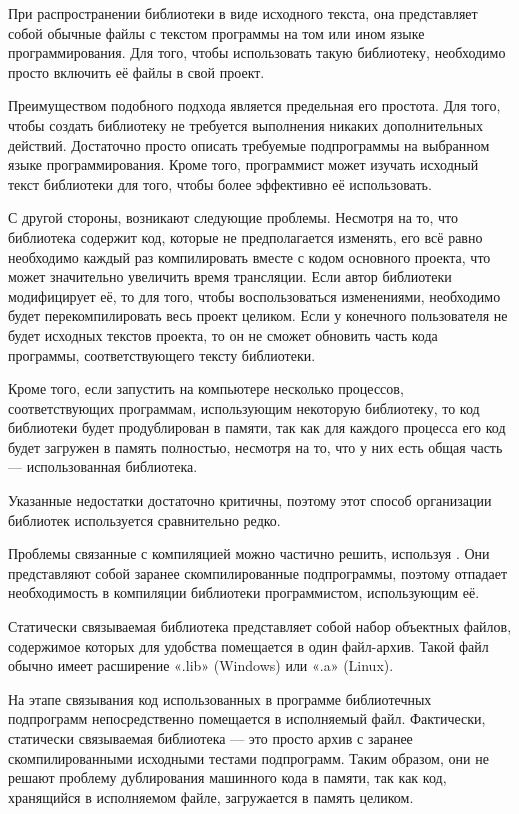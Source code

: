 При распространении библиотеки в виде исходного текста, она
представляет собой обычные файлы с текстом программы на том или ином
языке программирования. Для того, чтобы использовать такую библиотеку,
необходимо просто включить её файлы в свой проект.

Преимуществом подобного подхода является предельная его простота.  Для
того, чтобы создать библиотеку не требуется выполнения никаких
дополнительных действий. Достаточно просто описать требуемые
подпрограммы на выбранном языке программирования. Кроме того,
программист может изучать исходный текст библиотеки для того, чтобы
более эффективно её использовать.

С другой стороны, возникают следующие проблемы. Несмотря на то, что
библиотека содержит код, которые не предполагается изменять, его всё
равно необходимо каждый раз компилировать вместе с кодом основного
проекта, что может значительно увеличить время трансляции. Если автор
библиотеки модифицирует её, то для того, чтобы воспользоваться
изменениями, необходимо будет перекомпилировать весь проект
целиком. Если у конечного пользователя не будет исходных текстов
проекта, то он не сможет обновить часть кода программы,
соответствующего тексту библиотеки.

Кроме того, если запустить на компьютере несколько процессов,
соответствующих программам, использующим некоторую библиотеку, то код
библиотеки будет продублирован в памяти, так как для каждого процесса
его код будет загружен в память полностью, несмотря на то, что у них
есть общая часть — использованная библиотека.

Указанные недостатки достаточно критичны, поэтому этот способ
организации библиотек используется сравнительно редко.

Проблемы связанные с компиляцией можно частично решить, используя
. Они представляют собой заранее скомпилированные
подпрограммы, поэтому отпадает необходимость в компиляции библиотеки
программистом, использующим её.

Статически связываемая библиотека представляет собой набор объектных
файлов, содержимое которых для удобства помещается в один файл-архив.
Такой файл обычно имеет расширение «.lib» (Windows) или «.a» (Linux).

На этапе связывания код использованных в программе библиотечных
подпрограмм непосредственно помещается в исполняемый файл. Фактически,
статически связываемая библиотека — это просто архив с заранее
скомпилированными исходными тестами подпрограмм. Таким образом, они не
решают проблему дублирования машинного кода в памяти, так как код,
хранящийся в исполняемом файле, загружается в память целиком.

